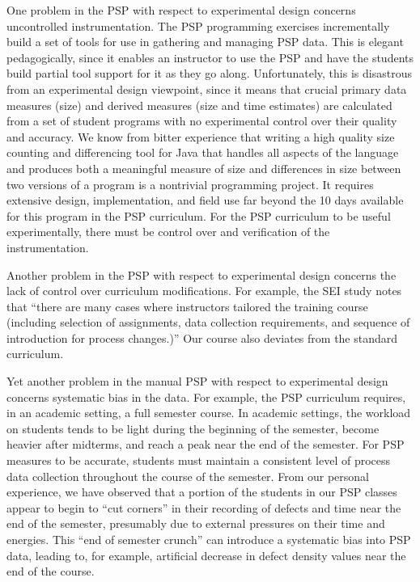 One problem in the PSP with respect to experimental design concerns
uncontrolled instrumentation. The PSP programming exercises incrementally
build a set of tools for use in gathering and managing PSP data.  This is
elegant pedagogically, since it enables an instructor to use the PSP and
have the students build partial tool support for it as they go along.
Unfortunately, this is disastrous from an experimental design viewpoint,
since it means that crucial primary data measures (size) and derived
measures (size and time estimates) are calculated from a set of student
programs with no experimental control over their quality and accuracy.  We
know from bitter experience that writing a high quality size counting and
differencing tool for Java that handles all aspects of the language and
produces both a meaningful measure of size and differences in size between
two versions of a program is a nontrivial programming project. It
requires extensive design, implementation, and field use far beyond the 10
days available for this program in the PSP curriculum.  For the PSP
curriculum to be useful experimentally, there must be control over and
verification of the instrumentation.

Another problem in the PSP with respect to experimental design concerns the
lack of control over curriculum modifications.  For example, the SEI study
notes that ``there are many cases where instructors tailored the training
course (including selection of assignments, data collection requirements,
and sequence of introduction for process changes.)''  Our course also
deviates from the standard curriculum. 
  
Yet another problem in the manual PSP with respect to experimental design
concerns systematic bias in the data. For example, the PSP curriculum
requires, in an academic setting, a full semester course. In academic
settings, the workload on students tends to be light during the beginning
of the semester, become heavier after midterms, and reach a peak near the
end of the semester.  For PSP measures to be accurate, students must
maintain a consistent level of process data collection throughout the
course of the semester.  From our personal experience, we have observed
that a portion of the students in our PSP classes appear to begin to ``cut
corners'' in their recording of defects and time near the end of the semester,
presumably due to external pressures on their time and energies.  This
``end of semester crunch'' can introduce a systematic bias into PSP data,
leading to, for example, artificial decrease in defect density values
near the end of the course.


